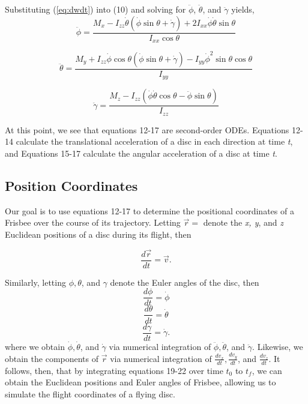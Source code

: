 \documentclass[a4paper,12pt, oneside]{article}
\begin{document}
Substituting (\ref{eq:dwdt}) into (10) and solving for $\ddot\phi$, $\ddot\theta$, and $\ddot\gamma$ yields,
\begin{equation}
\ddot\phi=\frac{M_x-I_{zz}\dot\theta(\dot\phi\sin\theta+\dot\gamma)+2I_{xx}\dot\phi\dot\theta\sin\theta}{I_{xx}\cos\theta}
\end{equation}

\begin{equation}
\ddot\theta=\frac{M_y+I_{zz}\dot\phi\cos\theta(\dot\phi\sin\theta+\dot\gamma)-I_{yy}\dot\phi^2\sin\theta\cos\theta} {I_{yy}}
\end{equation}

\begin{equation}
\ddot\gamma=\frac{M_z-I_{zz}(\dot\phi\dot\theta\cos\theta-\ddot\phi\sin\theta)}{I_{zz}}
\end{equation}

At this point, we see that equations 12-17 are second-order ODEs. Equations 12-14 calculate the translational acceleration of a disc in each direction at time \textit{t}, and Equations 15-17 calculate the angular acceleration of a disc at time \textit{t}.

\subsection{Position Coordinates}
\color{BurntOrange}
Our goal is to use equations 12-17 to determine the positional coordinates of a Frisbee over the course of its trajectory. Letting $\vec{r}=$ denote the \textit{x, y}, and \textit{z} Euclidean positions of a disc during its flight, then 

\begin{equation}
  \label{eq:position_deriv}
  \frac{d\vec{r}}{dt} = \vec{v}.
\end{equation}

Similarly, letting $\phi, \theta$, and $\gamma$ denote the Euler angles of the disc, then
\begin{equation}
\frac{d\phi}{dt}=\dot\phi
\end{equation}
\begin{equation}
\frac{d\theta}{dt}=\dot\theta
\end{equation}
\begin{equation}
\frac{d\gamma}{dt}=\dot\gamma.
\end{equation}
where we obtain $\dot\phi, \dot\theta$, and $\dot\gamma$ via numerical integration of $\ddot\phi, \ddot\theta$, and $\ddot\gamma$. Likewise, we obtain the components of $\vec{r}$ via numerical integration of $\frac{{dv}_x}{dt}, \frac{{dv}_y}{dt}$, and $\frac{{dv}_z}{dt}$. It follows, then, that by integrating equations 19-22 over time $t_0$ to $t_f$, we can obtain the Euclidean positions and Euler angles of Frisbee, allowing us to simulate the flight coordinates of a flying disc. 
\end{document}
